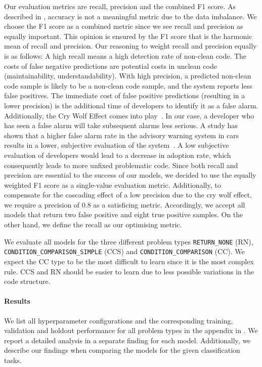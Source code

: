 Our evaluation metrics are recall, precision and the combined F1 score. As described in , accuracy is not a meaningful metric due to the data imbalance. We choose the F1 score as a combined metric since we see recall and precision as equally important. This opinion is ensured by the F1 score that is the harmonic mean of recall and precision.
Our reasoning to weight recall and precision equally is as follows:
A high recall means a high detection rate of non-clean code. The costs of false negative predictions are potential costs in unclean code (maintainability, understandability). With high precision, a predicted non-clean code sample is likely to be a non-clean code sample, and the system reports less false positives. The immediate cost of false positive predictions (resulting in a lower precision) is the additional time of developers to identify it as a false alarm.
Additionally, the Cry Wolf Effect comes into play~\cite{breznitz_cry_1984}. In our case, a developer who has seen a false alarm will take subsequent alarms less serious. A study has shown that a higher false alarm rate in the advisory warning system in cars results in a lower, subjective evaluation of the system~\cite{naujoks_cooperative_2016}. A low subjective evaluation of developers would lead to a decrease in adoption rate, which consequently leads to more unfixed problematic code. Since both recall and precision are essential to the success of our models, we decided to use the equally weighted F1 score as a single-value evaluation metric.
Additionally, to compensate for the cascading effect of a low precision due to the cry wolf effect, we require a precision of 0.8 as a satisficing metric. Accordingly, we accept all models that return two false positive and eight true positive samples. On the other hand, we define the recall as our optimising metric. 

We evaluate all models for the three different problem types \texttt{RETURN\_NONE} (RN), \texttt{CONDITION\_COMPARISON\_SIMPLE} (CCS) and \texttt{CONDITION\_COMPARISON} (CC). We expect the CC type to be the most difficult to learn since it is the most complex rule. CCS and RN should be easier to learn due to less possible variations in the code structure.

\paragraph{Results}
We list all hyperparameter configurations and the corresponding training, validation and holdout performance for all problem types in the appendix in . We report a detailed analysis in a separate finding for each model. Additionally, we describe our findings when comparing the models for the given classification tasks.



